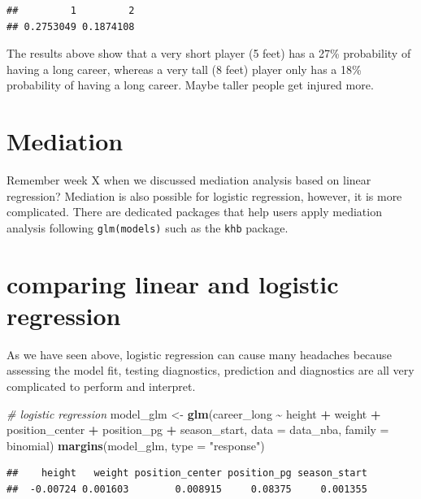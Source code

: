 \documentclass[
]{book}
\newenvironment{Shaded}{\begin{snugshade}}{\end{snugshade}}
\newcommand{\AttributeTok}[1]{\textcolor[rgb]{0.13,0.29,0.53}{#1}}
\newcommand{\CommentTok}[1]{\textcolor[rgb]{0.56,0.35,0.01}{\textit{#1}}}
\newcommand{\FunctionTok}[1]{\textcolor[rgb]{0.13,0.29,0.53}{\textbf{#1}}}
\newcommand{\NormalTok}[1]{#1}
\newcommand{\OtherTok}[1]{\textcolor[rgb]{0.56,0.35,0.01}{#1}}
\newcommand{\SpecialCharTok}[1]{\textcolor[rgb]{0.81,0.36,0.00}{\textbf{#1}}}
\newcommand{\StringTok}[1]{\textcolor[rgb]{0.31,0.60,0.02}{#1}}
\begin{document}
\begin{verbatim}
##         1         2 
## 0.2753049 0.1874108
\end{verbatim}

The results above show that a very short player (5 feet) has a 27\% probability of having a long career, whereas a very tall (8 feet) player only has a 18\% probability of having a long career. Maybe taller people get injured more.

\hypertarget{mediation-1}{%
\section{Mediation}\label{mediation-1}}

Remember week X when we discussed mediation analysis based on linear regression?
Mediation is also possible for logistic regression, however, it is more complicated.
There are dedicated packages that help users apply mediation analysis following
\texttt{glm(models)} such as the \texttt{khb} package.

\hypertarget{comparing-linear-and-logistic-regression}{%
\section{comparing linear and logistic regression}\label{comparing-linear-and-logistic-regression}}

As we have seen above, logistic regression can cause many headaches because
assessing the model fit, testing diagnostics, prediction and diagnostics are
all very complicated to perform and interpret.

\begin{Shaded}
\begin{Highlighting}[]
\CommentTok{\# logistic regression}
\NormalTok{model\_glm }\OtherTok{\textless{}{-}} \FunctionTok{glm}\NormalTok{(career\_long }\SpecialCharTok{\textasciitilde{}}\NormalTok{ height }\SpecialCharTok{+}\NormalTok{ weight }\SpecialCharTok{+}\NormalTok{ position\_center }\SpecialCharTok{+}\NormalTok{ position\_pg }\SpecialCharTok{+}
\NormalTok{                      season\_start,}
                    \AttributeTok{data =}\NormalTok{ data\_nba,}
                    \AttributeTok{family =}\NormalTok{ binomial)}
\FunctionTok{margins}\NormalTok{(model\_glm, }\AttributeTok{type =} \StringTok{"response"}\NormalTok{)}
\end{Highlighting}
\end{Shaded}

\begin{verbatim}
##    height   weight position_center position_pg season_start
##  -0.00724 0.001603        0.008915     0.08375     0.001355
\end{verbatim}
\end{document}
